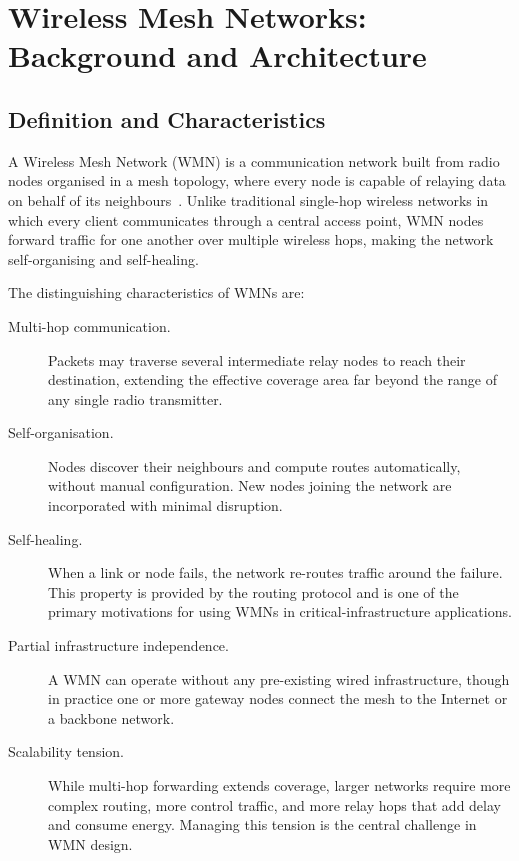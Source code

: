 \chapter{Wireless Mesh Networks: Background and Architecture}
\label{ch:wmn}

\section{Definition and Characteristics}

A Wireless Mesh Network (WMN) is a communication network built from radio nodes
organised in a mesh topology, where every node is capable of relaying data on behalf of
its neighbours~\cite{akyildiz2005wmn}. Unlike traditional single-hop wireless networks
in which every client communicates through a central access point, WMN nodes forward
traffic for one another over multiple wireless hops, making the network self-organising
and self-healing.

The distinguishing characteristics of WMNs are:

\begin{description}
  \item[Multi-hop communication.] Packets may traverse several intermediate relay nodes
    to reach their destination, extending the effective coverage area far beyond the range
    of any single radio transmitter.
  \item[Self-organisation.] Nodes discover their neighbours and compute routes
    automatically, without manual configuration. New nodes joining the network are
    incorporated with minimal disruption.
  \item[Self-healing.] When a link or node fails, the network re-routes traffic around
    the failure. This property is provided by the routing protocol and is one of the
    primary motivations for using WMNs in critical-infrastructure applications.
  \item[Partial infrastructure independence.] A WMN can operate without any
    pre-existing wired infrastructure, though in practice one or more gateway nodes
    connect the mesh to the Internet or a backbone network.
  \item[Scalability tension.] While multi-hop forwarding extends coverage, larger networks
    require more complex routing, more control traffic, and more relay hops that add delay
    and consume energy. Managing this tension is the central challenge in WMN design.
\end{description}

